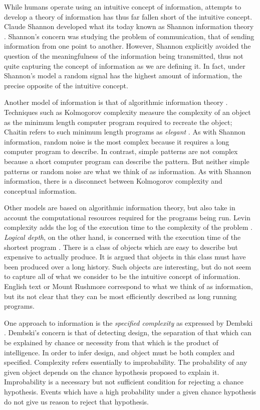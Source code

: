 While humans operate using an intuitive concept of information, attempts to develop a theory of information has thus far fallen short of the intuitive concept.
Claude Shannon developed what its today known as Shannon information theory \citep{Shannon1948}.
Shannon's concern was studying the problem of communication, that of sending information from one point to another.
However, Shannon explicitly avoided the question of the meaningfulness of the information being transmitted, thus not quite capturing the concept of information as we are defining it.
In fact, under Shannon's model a random signal has the highest amount of information, the precise opposite of the intuitive concept.

Another model of information is that of algorithmic information theory \citep{Chaitin1966, Solomonoff1960, Kolmogorov1968a}.
Techniques such as Kolmogorov complexity measure the complexity of an object as the minimum length computer program required to recreate the object; Chaitin refers to such minimum length programs as \textit{elegant} \cite{Chaitin2002}.
As with Shannon information, random noise is the most complex because it requires a long computer program to describe.
In contrast, simple patterns are not complex because a short computer program can describe the pattern.
But neither simple patterns or random noise are what we think of as information.
As with Shannon information, there is a disconnect between Kolmogorov complexity and conceptual information.

Other models are based on algorithmic information theory, but also take in account the computational resources required for the programs being run.
Levin complexity adds the log of the execution time to the complexity of the problem \citep{Levin1976}.
\textit{Logical depth}, on the other hand, is concerned with the execution time of the shortest program \citep{Bennett1988}.
There is a class of objects which are easy to describe but expensive to actually produce.
It is argued \citep{Bennett1998} that objects in this class must have been produced over a long history.
Such objects are interesting, but do not seem to capture all of what we consider to be the intuitive concept of information.
English text or Mount Rushmore correspond to what we think of as information, but its not clear that they can be most efficiently described as long running programs.

One approach to information is the \textit{specified complexity} as expressed by Dembski \citep{Dembski1998}.
Dembski's concern is that of detecting design, the separation of that which can be explained by chance or necessity from that which is the product of intelligence. 
In order to infer design, and object must be both complex and specified.
Complexity refers essentially to improbability.
The probability of any given object depends on the chance hypothesis proposed to explain it.
Improbability is a necessary but not sufficient condition for rejecting a chance hypothesis.
Events which have a high probability under a given chance hypothesis do not give us reason to reject that hypothesis.

